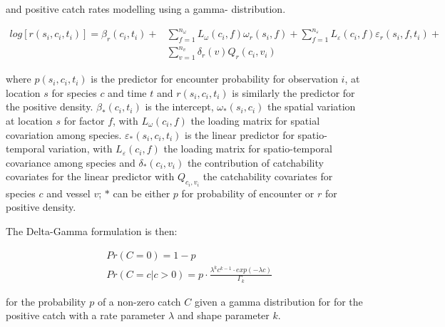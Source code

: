 \documentclass{nature}
\begin{document}
\begin{linenumbers}
and positive catch rates modelling using a gamma- distribution\cite{Thorson2015a}.

		\begin{equation}
			\begin{split}
			log[r(s_{i},c_{i},t_{i})] = \beta_{r}(c_{i},t_{i}) +
			& \sum\limits_{f=1}^{n_{\omega}} L_{\omega}(c_{i},f)
			\omega_{r}(s_{i},f) +\sum\limits_{f=1}^{n_{\varepsilon}} 
			L_{\varepsilon}(c_{i},f) \varepsilon_{r}(s_{i},f,t_{i}) + \\
			& \sum\limits_{v=1}^{n_{v}}\delta_{r}(v) Q_{r}(c_{i}, v_{i})
			\end{split}
		\end{equation}

where $p(s_{i}, c_{i}, t_{i})$ is the predictor for encounter probability for
observation $i$, at location $s$ for species $c$ and time $t$ and $r(s_{i},
c_{i}, t_{i})$ is similarly the predictor for the positive density.
$\beta_{*}(c_{i},t_{i})$ is the intercept, $\omega_{*}(s_{i},c_{i})$ the
spatial variation at location $s$ for factor $f$, with $L_{\omega}(c_{i},f)$
the loading matrix for spatial covariation among species.
$\varepsilon_{*}(s_{i},c_{i},t_{i})$ is the linear predictor for
spatio-temporal variation, with $L_{\varepsilon}(c_{i}, f)$ the loading matrix
for spatio-temporal covariance among species and $\delta_{*}(c_{i}, v_{i})$ the
contribution of catchability covariates for the linear predictor with
$Q_{c_{i}, v_{i}}$ the catchability covariates for species $c$ and vessel $v$;
$*$ can be either $p$ for probability of encounter or $r$ for positive density.

The Delta-Gamma formulation is then:

\begin{equation}
	\begin{split}
	& Pr(C = 0) = 1 - p \\
	& Pr(C = c | c > 0) = p \cdot \frac{\lambda^{k}c^{k-1} \cdot exp(-\lambda c)}{\Gamma_{k}}
	\end{split}
\end{equation}

for the probability $p$ of a non-zero catch $C$ given a gamma distribution for
for the positive catch with a rate parameter $\lambda$ and shape parameter $k$.


\end{linenumbers}
\end{document}
